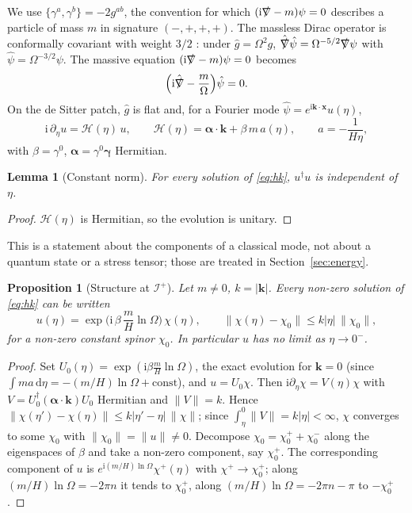 \documentclass[11pt,a4paper]{article}
\newtheorem{proposition}{Proposition}
\newtheorem{lemma}{Lemma}
\theoremstyle{definition}
\newcommand{\scri}{\mathscr{I}^{+}}
\newcommand{\dd}{\mathrm{d}}
\newcommand{\ii}{\mathrm{i}}
\newcommand{\hg}{\hat g}
\newcommand{\hpsi}{\hat\psi}
\begin{document}
We use $\{\gamma^{a},\gamma^{b}\}=-2g^{ab}$, the convention for which $(\ii\slashed\nabla-m)\psi=0$ describes a particle of mass $m$ in signature $(-,+,+,+)$. The massless Dirac operator is conformally covariant with weight $3/2$ \cite{BirrellDavies,ParkerToms}: under $\hg=\Omega^{2}g$, $\hat{\slashed\nabla}\hpsi=\Omega^{-5/2}\slashed\nabla\psi$ with $\hpsi=\Omega^{-3/2}\psi$. The massive equation $(\ii\slashed\nabla-m)\psi=0$ becomes
\begin{equation}
\Big(\ii\hat{\slashed\nabla}-\frac{m}{\Omega}\Big)\hpsi=0 .
\label{eq:dirachat}
\end{equation}
On the de Sitter patch, $\hg$ is flat and, for a Fourier mode $\hpsi=e^{\ii\mathbf{k}\cdot\mathbf{x}}u(\eta)$,
\begin{equation}
\ii\,\partial_{\eta}u=\mathcal{H}(\eta)\,u,\qquad \mathcal{H}(\eta)=\boldsymbol\alpha\cdot\mathbf{k}+\beta\,m\,a(\eta),\qquad a=-\frac{1}{H\eta},
\label{eq:hk}
\end{equation}
with $\beta=\gamma^{0}$, $\boldsymbol\alpha=\gamma^{0}\boldsymbol\gamma$ Hermitian.

\begin{lemma}[Constant norm]
\label{lem:norm}
For every solution of \eqref{eq:hk}, $u^{\dagger}u$ is independent of $\eta$.
\end{lemma}
\begin{proof}
$\mathcal{H}(\eta)$ is Hermitian, so the evolution is unitary.
\end{proof}

This is a statement about the components of a classical mode, not about a quantum state or a stress tensor; those are treated in Section~\ref{sec:energy}.

\begin{proposition}[Structure at $\scri$]
\label{prop:dirac}
Let $m\neq0$, $k=|\mathbf{k}|$. Every non-zero solution of \eqref{eq:hk} can be written
\begin{equation}
u(\eta)=\exp\!\Big(\ii\,\beta\,\frac{m}{H}\ln\Omega\Big)\,\chi(\eta),\qquad \|\chi(\eta)-\chi_{0}\|\le k|\eta|\,\|\chi_{0}\|,
\label{eq:structure}
\end{equation}
for a non-zero constant spinor $\chi_{0}$. In particular $u$ has no limit as $\eta\to0^{-}$.
\end{proposition}
\begin{proof}
Set $U_{0}(\eta)=\exp(\ii\beta\frac{m}{H}\ln\Omega)$, the exact evolution for $\mathbf{k}=0$ (since $\int m a\,\dd\eta=-(m/H)\ln\Omega+\text{const}$), and $u=U_{0}\chi$. Then $\ii\partial_{\eta}\chi=V(\eta)\chi$ with $V=U_{0}^{\dagger}(\boldsymbol\alpha\cdot\mathbf{k})U_{0}$ Hermitian and $\|V\|=k$. Hence $\|\chi(\eta')-\chi(\eta)\|\le k|\eta'-\eta|\,\|\chi\|$; since $\int_{\eta}^{0}\|V\|=k|\eta|<\infty$, $\chi$ converges to some $\chi_{0}$ with $\|\chi_{0}\|=\|u\|\neq0$. Decompose $\chi_{0}=\chi_{0}^{+}+\chi_{0}^{-}$ along the eigenspaces of $\beta$ and take a non-zero component, say $\chi_{0}^{+}$. The corresponding component of $u$ is $e^{\ii(m/H)\ln\Omega}\chi^{+}(\eta)$ with $\chi^{+}\to\chi_{0}^{+}$; along $(m/H)\ln\Omega=-2\pi n$ it tends to $\chi_{0}^{+}$, along $(m/H)\ln\Omega=-2\pi n-\pi$ to $-\chi_{0}^{+}$.
\end{proof}
\end{document}
